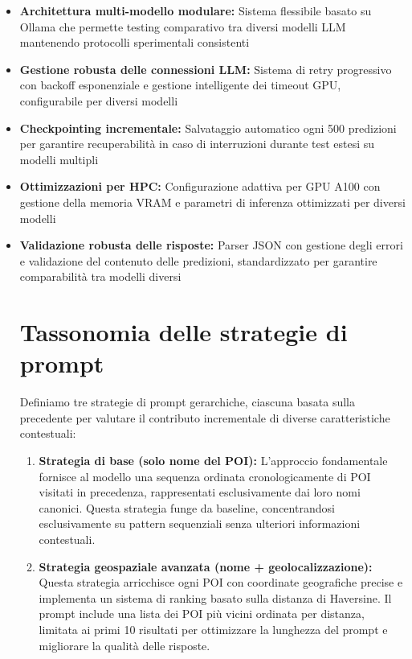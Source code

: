 \begin{itemize}
\item \textbf{Architettura multi-modello modulare:} Sistema flessibile basato su Ollama che permette testing comparativo tra diversi modelli LLM mantenendo protocolli sperimentali consistenti
\item \textbf{Gestione robusta delle connessioni LLM:} Sistema di retry progressivo con backoff esponenziale e gestione intelligente dei timeout GPU, configurabile per diversi modelli
\item \textbf{Checkpointing incrementale:} Salvataggio automatico ogni 500 predizioni per garantire recuperabilità in caso di interruzioni durante test estesi su modelli multipli
\item \textbf{Ottimizzazioni per HPC:} Configurazione adattiva per GPU A100 con gestione della memoria VRAM e parametri di inferenza ottimizzati per diversi modelli
\item \textbf{Validazione robusta delle risposte:} Parser JSON con gestione degli errori e validazione del contenuto delle predizioni, standardizzato per garantire comparabilità tra modelli diversi

\section{Tassonomia delle strategie di prompt}

Definiamo tre strategie di prompt gerarchiche, ciascuna basata sulla precedente per valutare il contributo incrementale di diverse caratteristiche contestuali:

\begin{enumerate}

\item \textbf{Strategia di base (solo nome del POI):} L'approccio fondamentale fornisce al modello una sequenza ordinata cronologicamente di POI visitati in precedenza, rappresentati esclusivamente dai loro nomi canonici. Questa strategia funge da baseline, concentrandosi esclusivamente su pattern sequenziali senza ulteriori informazioni contestuali.

\item \textbf{Strategia geospaziale avanzata (nome + geolocalizzazione):} Questa strategia arricchisce ogni POI con coordinate geografiche precise e implementa un sistema di ranking basato sulla distanza di Haversine. Il prompt include una lista dei POI più vicini ordinata per distanza, limitata ai primi 10 risultati per ottimizzare la lunghezza del prompt e migliorare la qualità delle risposte.


\end{enumerate}
\end{itemize}
